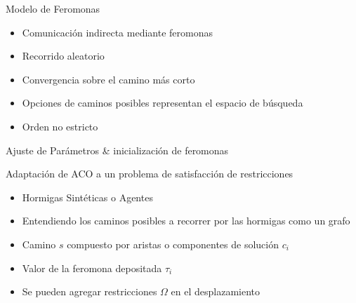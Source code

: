\begin{frame}{Modelo de Feromonas}
\small
\begin{itemize}
    \item Comunicaci\'on indirecta mediante feromonas
    \item Recorrido aleatorio
    \item Convergencia sobre el camino m\'as corto
    \item Opciones de caminos posibles representan el espacio de b\'usqueda
    \item Orden no estricto
\end{itemize}
    \begin{algorithm}[H]
    \SetAlgoLined
     Ajuste de Par\'ametros \& inicializaci\'on de feromonas\;
     \caption{Algoritmo metaheur\'istica ACO}\label{ACO-Algo}
    \end{algorithm}
\end{frame}

\begin{frame}{Adaptaci\'on de ACO a un problema de satisfacci\'on de restricciones}
    \begin{itemize}
        \item Hormigas Sint\'eticas o Agentes
        \item Entendiendo los caminos posibles a recorrer por las hormigas como un grafo
        \item Camino $s$ compuesto por aristas o componentes de soluci\'on $c_i$
        \item Valor de la feromona depositada $\tau_{i}$
        \item Se pueden agregar restricciones $\Omega$ en el desplazamiento
    \end{itemize}
\end{frame}

